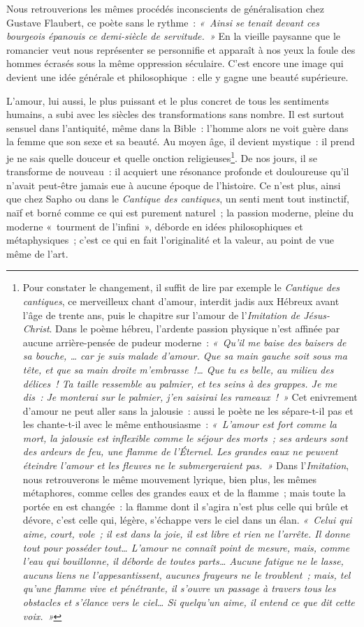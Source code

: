 \documentclass[french,twoside]{book} %
\begin{document}
\noindent Nous retrouverions les mêmes procédés inconscients de généralisation chez Gustave Flaubert, ce poète sans le rythme : \emph{« Ainsi se tenait devant ces bourgeois épanouis ce demi-siècle de servitude. »} En la vieille paysanne que le romancier veut nous représenter se personnifie et apparaît à nos yeux la foule des hommes écrasés sous la même oppression séculaire. C’est encore une image qui devient une idée générale et philosophique : elle y gagne une beauté supérieure.\par
L’amour, lui aussi, le plus puissant et le plus concret de tous les sentiments humains, a subi avec les siècles des transformations sans nombre. Il est surtout sensuel dans l’antiquité, même dans la Bible : l’homme alors ne voit guère dans la femme que son sexe et sa beauté. Au moyen âge, il devient mystique : il prend je ne sais quelle douceur et quelle onction religieuses\footnote{Pour constater le changement, il suffit de lire par exemple le \emph{Cantique des cantiques}, ce merveilleux chant d’amour, interdit jadis aux Hébreux avant l’âge de trente ans, puis le chapitre sur l’amour de l’\emph{Imitation de Jésus-Christ}. Dans le poème hébreu, l’ardente passion physique n’est affinée par aucune arrière-pensée de pudeur moderne : \emph{« Qu’il me baise des baisers de sa bouche, … car je suis malade d’amour. Que sa main gauche soit sous ma tête, et que sa main droite m’embrasse !… Que tu es belle, au milieu des délices ! Ta taille ressemble au palmier, et tes seins à des grappes. Je me dis : Je monterai sur le palmier, j’en saisirai les rameaux ! »} Cet enivrement d’amour ne peut aller sans la jalousie : aussi le poète ne les sépare-t-il pas et les chante-t-il avec le même enthousiasme : \emph{« L’amour est fort comme la mort, la jalousie est inflexible comme le séjour des morts ; ses ardeurs sont des ardeurs de feu, une flamme de l’Éternel. Les grandes eaux ne peuvent éteindre l’amour et les fleuves ne le submergeraient pas. »} Dans l’\emph{Imitation}, nous retrouverons le même mouvement lyrique, bien plus, les mêmes métaphores, comme celles des grandes eaux et de la flamme ; mais toute la portée en est changée : la flamme dont il s’agira n’est plus celle qui brûle et dévore, c’est celle qui, légère, s’échappe vers le ciel dans un élan. \emph{« Celui qui aime, court, vole ; il est dans la joie, il est libre et rien ne l’arrête. Il donne tout pour posséder tout… L’amour ne connaît point de mesure, mais, comme l’eau qui bouillonne, il déborde de toutes parts… Aucune fatigue ne le lasse, aucuns liens ne l’appesantissent, aucunes frayeurs ne le troublent ; mais, tel qu’une flamme vive et pénétrante, il s’ouvre un passage à travers tous les obstacles et s’élance vers le ciel… Si quelqu’un aime, il entend ce que dit cette voix. »}}. De nos jours, il se  transforme de nouveau : il acquiert une résonance profonde et douloureuse qu’il n’avait peut-être jamais eue à aucune époque de l’histoire. Ce n’est plus, ainsi que chez Sapho ou dans le \emph{Cantique des cantiques}, un senti ment tout instinctif, naïf et borné comme ce qui est purement naturel ; la passion moderne, pleine du moderne « tourment de l’infini », déborde en idées philosophiques et métaphysiques ; c’est ce qui en fait l’originalité et la valeur, au point de vue même de l’art. 
\end{document}
